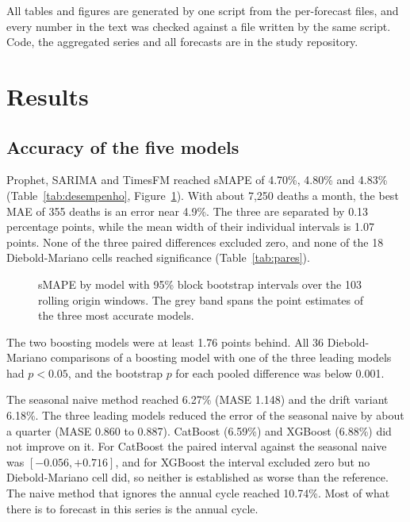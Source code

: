 All tables and figures are generated by one script from the per-forecast files, and every
number in the text was checked against a file written by the same script. Code, the
aggregated series and all forecasts are in the study repository.

\section{Results}

\subsection{Accuracy of the five models}



Prophet, SARIMA and TimesFM reached sMAPE of 4.70\%, 4.80\% and 4.83\% (Table~\ref{tab:desempenho},
Figure~\ref{fig:smape}). With about 7{,}250 deaths a month, the best MAE of 355 deaths is an
error near 4.9\%. The three are separated by 0.13 percentage points, while the mean width of
their individual intervals is 1.07 points. None of the three paired differences excluded
zero, and none of the 18 Diebold-Mariano cells reached significance (Table~\ref{tab:pares}).

\begin{figure}[htbp]
\centering

\caption{sMAPE by model with 95\% block bootstrap intervals over the 103 rolling origin
windows. The grey band spans the point estimates of the three most accurate models.}
\label{fig:smape}
\end{figure}



The two boosting models were at least 1.76 points behind. All 36 Diebold-Mariano
comparisons of a boosting model with one of the three leading models had $p<0.05$, and the
bootstrap $p$ for each pooled difference was below 0.001.

The seasonal naive method reached 6.27\% (MASE 1.148) and the drift variant 6.18\%. The
three leading models reduced the error of the seasonal naive by about a quarter (MASE 0.860
to 0.887). CatBoost (6.59\%) and XGBoost (6.88\%) did not improve on it. For CatBoost the
paired interval against the seasonal naive was $[-0.056, +0.716]$, and for XGBoost the
interval excluded zero but no Diebold-Mariano cell did, so neither is established as worse
than the reference. The naive method that ignores the annual cycle reached 10.74\%. Most of
what there is to forecast in this series is the annual cycle.

